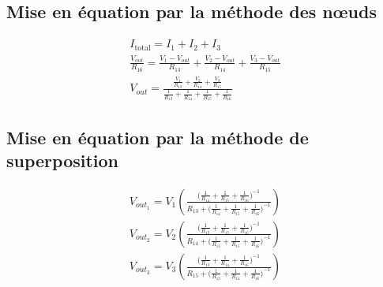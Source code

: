 \documentclass[a11paper, 11pt]{article}
\begin{document}
\subsection{Mise en équation par la méthode des n\oe uds}
\begin{gather}
	I_{\textrm{total}}   = I_1 + I_2 + I_3 \label{eq:sumOfI}   \\
	\frac{V_{out}}{R_{16}} = \frac{V_1-V_{out}}{R_{13}} +
	\frac{V_2-V_{out}}{R_{14}} + \frac{V_3-V_{out}}{R_{15}} \\
	V_{out} = \frac{\frac{V_1}{R_{13}}+\frac{V_2}{R_{14}}+\frac{V_3}{R_{15}}}
	{\frac{1}{R_{13}}+\frac{1}{R_{14}}+\frac{1}{R_{15}}+\frac{1}{R_{16}}} \label{eq:vOut-symb}
\end{gather}


\subsection{Mise en équation par la méthode de superposition}
\begin{gather}
	V_{out_1} = V_1\left(\frac{\big(\frac{1}{R_{14}}+\frac{1}{R_{15}}+\frac{1}{R_{16}}\big)^{-1}}
	{R_{13}+\big(\frac{1}{R_{14}}+\frac{1}{R_{15}}+\frac{1}{R_{16}}\big)^{-1}}\right) \\
	V_{out_2} = V_2\left(\frac{\big(\frac{1}{R_{13}}+\frac{1}{R_{15}}+\frac{1}{R_{16}}\big)^{-1}}
	{R_{14}+\big(\frac{1}{R_{13}}+\frac{1}{R_{15}}+\frac{1}{R_{16}}\big)^{-1}}\right) \\
	V_{out_3} = V_3\left(\frac{\big(\frac{1}{R_{13}}+\frac{1}{R_{14}}+\frac{1}{R_{16}}\big)^{-1}}
	{R_{15}+\big(\frac{1}{R_{13}}+\frac{1}{R_{14}}+\frac{1}{R_{16}}\big)^{-1}}\right)
\end{gather}

\newpage
\end{document}
